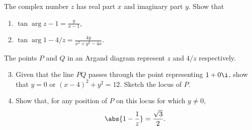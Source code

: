 \begin{problem}
    The complex number $z$ has real part $x$ and imaginary part $y$. Show that
    \begin{enumerate}
        \item $\displaystyle\tan{\arg{z-1}} = \frac{y}{x-1}$,
        \item $\displaystyle\tan{\arg{1 - 4/z}} = \frac{4y}{x^2 + y^2 - 4x}$.
    \end{enumerate}

    The points $P$ and $Q$ in an Argand diagram represent $z$ and $4/z$ respectively.
    \begin{enumerate}
        \setcounter{enumi}{2}
        \item Given that the line $PQ$ passes through the point representing $1 + 0\i$, show that $y = 0$ or $(x-4)^2 + y^2 = 12$. Sketch the locus of $P$.
        \item Show that, for any position of $P$ on this locus for which $y \neq 0$, \[\abs{1 - \frac1z} = \frac{\sqrt3}{2}.\]
    \end{enumerate}
\end{problem}
\clearpage
